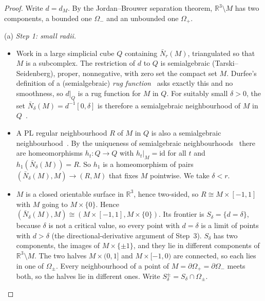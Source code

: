 \documentclass[preprint,12pt]{elsarticle}
\theoremstyle{definition}
\theoremstyle{remark}
\newcommand{\R}{\mathbb{R}}
\begin{document}
\begin{proof}
Write $d=d_M$. By the Jordan--Brouwer separation theorem, $\R^3\setminus M$ has two components, a bounded one
$\Omega_-$ and an unbounded one $\Omega_+$.

(a) \emph{Step 1: small radii.}
\begin{itemize}
\item Work in a large simplicial cube $Q$ containing $\bar N_r(M)$, triangulated so that $M$ is a subcomplex. The
restriction of $d$ to $Q$ is semialgebraic (Tarski--Seidenberg), proper, nonnegative, with zero set the compact set
$M$. Durfee's definition of a (semialgebraic) \emph{rug function}~\cite[Def.~3.1]{Durfee83} asks exactly this and no
smoothness, so $d|_Q$ is a rug function for $M$ in $Q$. For suitably small $\delta>0$, the set $\bar N_\delta(M)=d^{-1}[0,\delta]$
is therefore a semialgebraic neighbourhood of $M$ in $Q$~\cite[Def.~3.4]{Durfee83}.
\item A PL regular neighbourhood $R$ of $M$ in $Q$ is also a semialgebraic neighbourhood~\cite[Prop.~3.7]{Durfee83}.
By the uniqueness of semialgebraic neighbourhoods~\cite[Prop.~3.5]{Durfee83} there are homeomorphisms $h_t\colon Q\to Q$
with $h_t|_M=\mathrm{id}$ for all $t$ and $h_1(\bar N_\delta(M))=R$. So $h_1$ is a homeomorphism of pairs
$(\bar N_\delta(M),M)\to(R,M)$ that fixes $M$ pointwise. We take $\delta<r$.
\item $M$ is a closed orientable surface in $\R^3$, hence two-sided, so $R\cong M\times[-1,1]$ with $M$ going to
$M\times\{0\}$. Hence $(\bar N_\delta(M),M)\cong(M\times[-1,1],M\times\{0\})$. Its frontier is $S_\delta=\{d=\delta\}$,
because $\delta$ is not a critical value, so every point with $d=\delta$ is a limit of points with $d>\delta$ (the
directional-derivative argument of Step~3). $S_\delta$ has two
components, the images of $M\times\{\pm1\}$, and they lie in different components of $\R^3\setminus M$. The two halves
$M\times(0,1]$ and $M\times[-1,0)$ are connected, so each lies in one of $\Omega_\pm$. Every neighbourhood of a point
of $M=\partial\Omega_+=\partial\Omega_-$ meets both, so the halves lie in different ones. Write
$S_\delta^\pm=S_\delta\cap\Omega_\pm$.
\end{itemize}


\end{proof}
\end{document}
